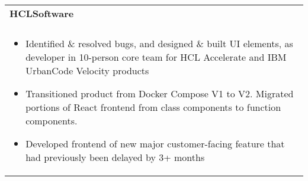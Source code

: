 \documentclass[letterpaper,10pt]{article} %
\begin{document}
\begin{tabular*}{\linewidth}{@{\extracolsep{\fill}} lr }
\textbf{HCLSoftware} & \scriptsize\bfseries\color{sectioncolour}{Remote}\\
\footnotesize\bfseries\color{sectioncolour}{Software Engineer Intern} & \scriptsize\bfseries\color{sectioncolour}{May 2023 - August 2023}\\
\multicolumn{2}{p{\linewidth}}{
    \scriptsize{\vspace{-0.1in}\begin{itemize}
        \item Identified \& resolved bugs, and designed \& built UI elements, as developer in 10-person core team for HCL Accelerate and IBM UrbanCode Velocity products
        \item Transitioned product from Docker Compose V1 to V2. Migrated portions of React frontend from class components to function components.
        \item Developed frontend of new major customer-facing feature that had previously been delayed by 3+ months
    \end{itemize}\vspace{-0.0in}}
}\\


\end{tabular*}
\end{document}
